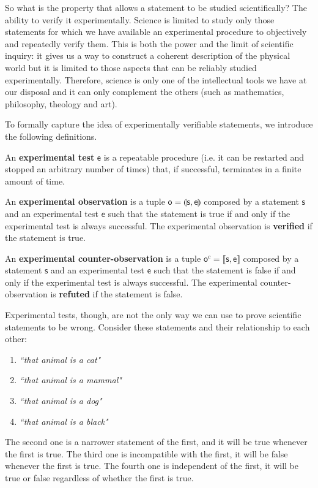\documentclass[11pt,letterpaper,fleqn]{memoir} %
\begin{document}
So what is the property that allows a statement to be studied scientifically? The ability to verify it experimentally. Science is limited to study only those statements for which we have available an experimental procedure to objectively and repeatedly verify them. This is both the power and the limit of scientific inquiry: it gives us a way to construct a coherent description of the physical world but it is limited to those aspects that can be reliably studied experimentally. Therefore, science is only one of the intellectual tools we have at our disposal and it can only complement the others (such as mathematics, philosophy, theology and art).

\begin{mathSection}

To formally capture the idea of experimentally verifiable statements, we introduce the following definitions.

\begin{defn}
	An \textbf{experimental test} $\mathsf{e}$ is a repeatable procedure (i.e. it can be restarted and stopped an arbitrary number of times) that, if successful, terminates in a finite amount of time.
\end{defn}

\begin{defn}
	An \textbf{experimental observation} is a tuple $\mathsf{o} = \llparenthesis \mathsf{s}, \mathsf{e} \rrparenthesis$ composed by a statement $\mathsf{s}$ and an experimental test $\mathsf{e}$ such that the statement is true if and only if the  experimental test is always successful. The experimental observation is \textbf{verified} if the statement is true.
\end{defn}

\begin{defn}
	An \textbf{experimental counter-observation} is a tuple $\mathsf{o}^c= \llbracket \mathsf{s}, \mathsf{e} \rrbracket$ composed by a statement $\mathsf{s}$ and an experimental test $\mathsf{e}$ such that the statement is false if and only if the experimental test is always successful. The experimental counter-observation is \textbf{refuted} if the statement is false.
\end{defn}
\end{mathSection}

Experimental tests, though, are not the only way we can use to prove scientific statements to be wrong. Consider these statements and their relationship to each other:
\begin{enumerate}
	\item \emph{``that animal is a cat"}
	\item \emph{``that animal is a mammal"}
	\item \emph{``that animal is a dog"}
	\item \emph{``that animal is a black"}
\end{enumerate}
The second one is a narrower statement of the first, and it will be true whenever the first is true. The third one is incompatible with the first, it will be false whenever the first is true. The fourth one is independent of the first, it will be true or false regardless of whether the first is true.
\end{document}
